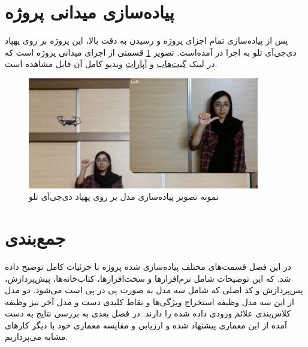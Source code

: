 \section{پیاده‌سازی میدانی پروژه}
پس از پیاده‌سازی تمام اجزای پروژه و رسیدن به دقت بالا، این پروژه بر روی پهپاد دی‌جی‌آی تلو به اجرا در آمده‌است. 
تصویر \ref{phisical} قسمتی از اجرای میدانی پروژه است که در لینک \href{https://github.com/sara-tajernia/hand-gesture-control_drone}{گیت‌هاب} و \href{https://www.aparat.com/v/chgtnhm}{آپارات} ویدیو کامل آن قابل مشاهده است.



\begin{figure}[h]
    \centering
    \includegraphics[width=0.9\textwidth]{drone_control.png}
    \caption{نمونه تصویر پیاده‌سازی مدل بر روی پهپاد دی‌جی‌آی تلو}
    \label{phisical}
\end{figure}

\section{جمع‌بندی}
در این فصل قسمت‌های مختلف پیاده‌سازی شده پروژه با جزئیات کامل توضیح داده شد. که این توضیحات شامل نرم‌افزار‌ها و سخت‌افزارها، کتاب‌خانه‌ها، پیش‌پردازش، پس‌پردازش و کد اصلی که شامل سه مدل به صورت پی در پی است می‌شود.
دو مدل از این سه مدل وظیفه استخراج ویژگی‌ها و نقاط کلیدی دست و مدل آخر نیز وظیفه کلاس‌بندی علائم ورودی داده شده را دارند.
در فصل بعدی به بررسی نتایج به دست آمده از این معماری پیشنهاد شده و ارزیابی و مقایسه معماری خود با دیگر کار‌های مشابه می‌پردازیم.


